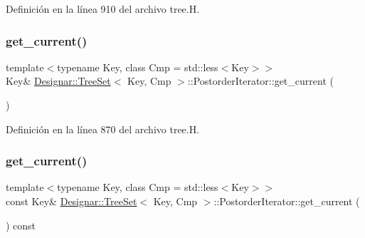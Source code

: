 Definición en la línea 910 del archivo tree.\+H.

\mbox{\label{class_designar_1_1_tree_set_1_1_postorder_iterator_aac01442bfcab349c1f427f480ff35c38}} 
\subsubsection{\texorpdfstring{get\+\_\+current()}{get\_current()}\hspace{0.1cm}{\footnotesize\ttfamily [1/2]}}
{\footnotesize\ttfamily template$<$typename Key, class Cmp = std\+::less$<$\+Key$>$$>$ \\
Key\& \hyperlink{class_designar_1_1_tree_set}{Designar\+::\+Tree\+Set}$<$ Key, Cmp $>$\+::Postorder\+Iterator\+::get\+\_\+current (\begin{DoxyParamCaption}{ }\end{DoxyParamCaption})\hspace{0.3cm}{\ttfamily [inline]}}



Definición en la línea 870 del archivo tree.\+H.

\mbox{\label{class_designar_1_1_tree_set_1_1_postorder_iterator_aa2d9802b08ed7377213619ae8fa90bc5}} 
\subsubsection{\texorpdfstring{get\+\_\+current()}{get\_current()}\hspace{0.1cm}{\footnotesize\ttfamily [2/2]}}
{\footnotesize\ttfamily template$<$typename Key, class Cmp = std\+::less$<$\+Key$>$$>$ \\
const Key\& \hyperlink{class_designar_1_1_tree_set}{Designar\+::\+Tree\+Set}$<$ Key, Cmp $>$\+::Postorder\+Iterator\+::get\+\_\+current (\begin{DoxyParamCaption}{ }\end{DoxyParamCaption}) const\hspace{0.3cm}{\ttfamily [inline]}}



